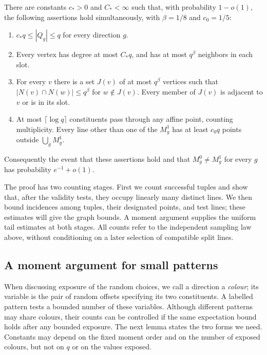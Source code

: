 \begin{proposition}\label{prop:candidate-graph}
There are constants $c_*>0$ and $C_*<\infty$ such that, with probability
$1-o(1)$, the following assertions hold simultaneously, with
$\beta=1/8$ and $c_0=1/5$:
\begin{enumerate}[label=\textup{(\roman*)}]
\item $c_*q\le |Q_g|\le q$ for every direction $g$.
\item Every vertex has degree at most $C_*q$, and has at most $q^\beta$
neighbors in each slot.
\item For every $v$ there is a set $J(v)$ of at most $q^\beta$ vertices
such that $|N(v)\cap N(w)|\le q^\beta$ for $w\notin J(v)$.
Every member of $J(v)$ is adjacent to $v$ or is in its slot.
\item At most $\lceil\log q\rceil$ constituents pass through any affine
point, counting multiplicity. Every line other than one of the $M_g^1$
has at least $c_0q$ points outside $\bigcup_gM_g^1$.
\end{enumerate}
Consequently the event that these assertions hold and that
$M_g^0\ne M_g^1$ for every $g$ has probability $e^{-1}+o(1)$.
\end{proposition}

The proof has two counting stages. First we count successful tuples and
show that, after the validity tests, they occupy linearly many distinct
lines. We then bound incidences among tuples, their designated points,
and test lines; these estimates will give the graph bounds. A moment
argument supplies the uniform tail estimates at both stages. All counts
refer to the independent sampling law above, without conditioning on a
later selection of compatible split lines.

\subsection{A moment argument for small patterns}

When discussing exposure of the random choices, we call a direction a
\emph{colour}; its variable is the pair of random offsets specifying its
two constituents. A labelled pattern tests a bounded number of these
variables. Although different patterns may share colours, their counts
can be controlled if the same expectation bound holds after any bounded
exposure. The next lemma states the two forms we need. Constants may
depend on the fixed moment order and on the number of exposed colours,
but not on $q$ or on the values exposed.

